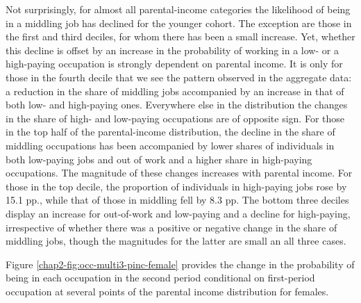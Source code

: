 Not surprisingly, for almost all parental-income categories the likelihood of being in a middling job has declined for the younger cohort. The exception are those in the first and third deciles, for whom there has been a small increase. Yet, whether this decline is offset by an increase in the probability of working in a low- or a high-paying occupation is strongly dependent on parental income. It is only for those in the fourth decile that we see the pattern observed in the aggregate data: a reduction in the share of middling jobs accompanied by an increase in that of both low- and high-paying ones. Everywhere else in the distribution the changes in the share of high- and low-paying occupations are of opposite sign. For those in the top half of the parental-income distribution, the decline in the share of middling occupations has been accompanied by lower shares of individuals in both low-paying jobs and out of work and a higher share in high-paying occupations. The magnitude of these changes increases with parental income. For those in the top decile, the proportion of individuals in high-paying jobs rose by 15.1 pp., while that of those in middling fell by 8.3 pp. The bottom three deciles display an increase for out-of-work and low-paying and a decline for high-paying, irrespective of whether there was a positive or negative change in the share of middling jobs, though the magnitudes for the latter are small an all three cases.

Figure \ref{chap2-fig:occ-multi3-pinc-female} provides the change in the probability of being in each occupation in the second period conditional on first-period occupation at several points of the parental income distribution for females. 

